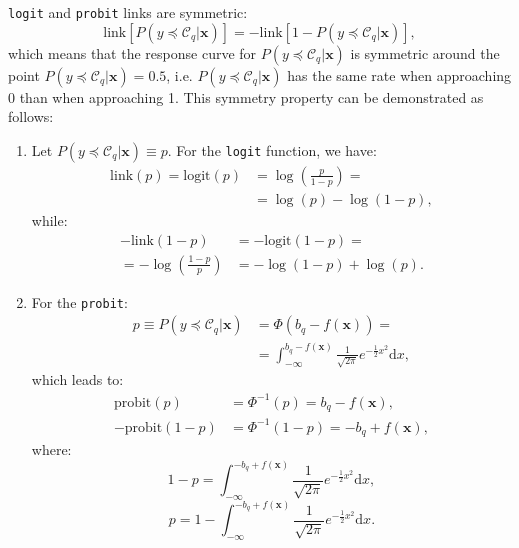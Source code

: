 \documentclass[journal]{IEEEtran}
\begin{document}
	\texttt{logit} and \texttt{probit} links are symmetric:	
	\begin{equation}
	\nonumber
	\text{link}[P(y \preceq \mathcal{C}_q | \mathbf{x})] = -\text{link}[1 - P(y \preceq \mathcal{C}_q | \mathbf{x})],
	\end{equation}
	which means that the response curve for $P(y \preceq \mathcal{C}_q | \mathbf{x})$ is symmetric around the point $P(y \preceq \mathcal{C}_q | \mathbf{x}) = 0.5$, i.e. $P(y \preceq \mathcal{C}_q | \mathbf{x})$ has the same rate when approaching 0 than when approaching 1. This symmetry property can be demonstrated as follows:	
	\begin{enumerate}
		\item Let $P(y \preceq \mathcal{C}_q | \mathbf{x}) \equiv p$. For the \texttt{logit} function, we have:
		\begin{equation}
		\nonumber
		\begin{aligned}
		\text{link}(p) = \text{logit}(p) &= \log\left(\frac{p}{1-p}\right) =\\
		&= \log(p) - \log(1-p),
		\end{aligned}
		\end{equation}			
		while:			
		\begin{equation}
		\nonumber
		\begin{aligned}
		-\text{link}(1 - p) &= -\text{logit}(1 - p) =\\
		=- \log\left(\frac{1- p}{p}\right) &= - \log(1 - p) + \log(p).
		\end{aligned}
		\end{equation}
		
		\item For the \texttt{probit}:		
		\begin{equation}
		\nonumber
		\begin{aligned}
		p \equiv P(y \preceq \mathcal{C}_q | \mathbf{x}) &= \Phi(b_q - f(\mathbf{x})) =\\
		&= \int_{-\infty}^{b_q - f(\mathbf{x})} \frac{1}{\sqrt{2\pi}} e^{-\frac{1}{2}x^2} \mathrm{d}x,
		\end{aligned}
		\end{equation}
		which leads to:
		\begin{align}
		\nonumber \text{probit}(p) & = \Phi^{-1}(p) = b_q - f(\mathbf{x}),\\
		\nonumber -\text{probit}(1-p) &= \Phi^{-1}(1-p) = -b_q + f(\mathbf{x}),
		\end{align}
		where:		
		\begin{equation}
		\nonumber
		1 - p = \int_{-\infty}^{-b_q + f(\mathbf{x})} \frac{1}{\sqrt{2\pi}} e^{-\frac{1}{2}x^2} \mathrm{d}x,
		\end{equation}
		\begin{equation}
		\nonumber
		p = 1 - \int_{-\infty}^{-b_q + f(\mathbf{x})} \frac{1}{\sqrt{2\pi}} e^{-\frac{1}{2}x^2} \mathrm{d}x.
		\end{equation}
	\end{enumerate}
	
\end{document}
